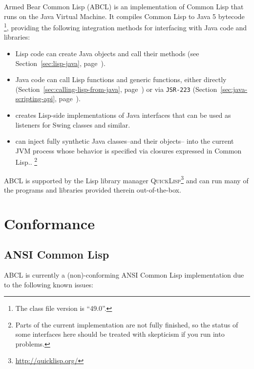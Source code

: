 \documentclass[10pt]{book}
\begin{document}
Armed Bear Common Lisp (\textsc{ABCL}) is an implementation of Common
Lisp that runs on the Java Virtual Machine.  It compiles Common Lisp
to Java 5 bytecode \footnote{The class file version is ``49.0''.},
providing the following integration methods for interfacing with Java
code and libraries:
\begin{itemize}
\item Lisp code can create Java objects and call their methods (see
  Section~\ref{sec:lisp-java}, page~\pageref{sec:lisp-java}).
\item Java code can call Lisp functions and generic functions, either
  directly (Section~\ref{sec:calling-lisp-from-java},
  page~\pageref{sec:calling-lisp-from-java}) or via \texttt{JSR-223}
  (Section~\ref{sec:java-scripting-api},
  page~\pageref{sec:java-scripting-api}).
\item {} creates Lisp-side implementations
  of Java interfaces that can be used as listeners for Swing classes and
  similar.
\item {} can inject fully synthetic Java
  classes--and their objects-- into the current JVM process whose
  behavior is specified via closures expressed in Common Lisp.. \footnote{Parts of
    the current implementation are not fully finished, so the status
    of some interfaces here should be treated with skepticism if you
    run into problems.}

\end{itemize}
\textsc{ABCL} is supported by the Lisp library manager
\textsc{QuickLisp}\footnote{\url{http://quicklisp.org/}} and can run many of the
programs and libraries provided therein out-of-the-box.

\section{Conformance}
\label{section:conformance}

\subsection{ANSI Common Lisp}
\textsc{ABCL} is currently a (non)-conforming \textsc{ANSI} Common Lisp
implementation due to the following known issues:
\end{document}
